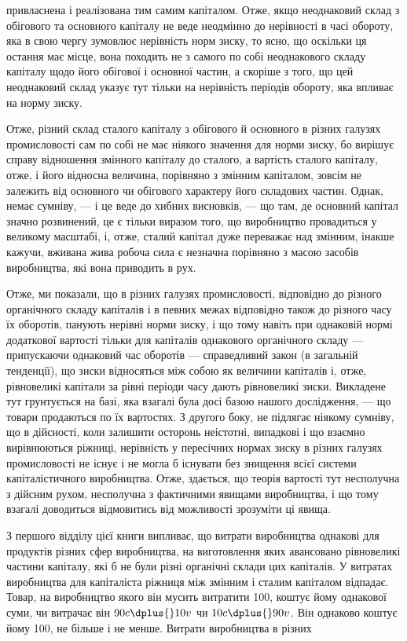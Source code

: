 \parcont{}  %
привласнена і реалізована тим самим капіталом. Отже, якщо неоднаковий склад з обігового та основного
капіталу не веде неодмінно до нерівності в часі обороту, яка в свою чергу зумовлює нерівність норм
зиску, то ясно, що оскільки ця остання
має місце, вона походить не з самого по собі неоднакового
складу капіталу щодо його обігової і основної частин, а скоріше
з того, що цей неоднаковий склад указує тут тільки на нерівність періодів обороту, яка впливає на
норму зиску.

Отже, різний склад сталого капіталу з обігового й основного
в різних галузях промисловості сам по собі не має ніякого значення для норми зиску, бо вирішує
справу відношення змінного капіталу до сталого, а вартість сталого капіталу, отже, і його
відносна величина, порівняно з змінним капіталом, зовсім не залежить від основного чи обігового
характеру його складових
частин. Однак, немає сумніву, — і це веде до хибних висновків, — що там, де основний капітал значно
розвинений, це є
тільки виразом того, що виробництво провадиться у великому
масштабі, і, отже, сталий капітал дуже переважає над змінним,
інакше кажучи, вживана жива робоча сила є незначна порівняно з масою засобів виробництва, які вона
приводить в рух.

Отже, ми показали, що в різних галузях промисловості, відповідно до різного органічного складу
капіталів і в певних
межах відповідно також до різного часу їх оборотів, панують
нерівні норми зиску, і що тому навіть при однаковій нормі додаткової вартості тільки для капіталів
однакового органічного
складу — припускаючи однаковий час оборотів — справедливий
закон (в загальній тенденції), що зиски відносяться між собою
як величини капіталів і, отже, рівновеликі капітали за рівні
періоди часу дають рівновеликі зиски. Викладене тут грунтується
на базі, яка взагалі була досі базою нашого дослідження, — що товари продаються по їх вартостях. З
другого боку, не підлягає ніякому сумніву, що в дійсності, коли залишити осторонь
неістотні, випадкові і що взаємно вирівнюються ріжниці, нерівність у пересічних нормах зиску в
різних галузях промисловості не існує і не могла б існувати без знищення всієї системи
капіталістичного виробництва. Отже, здається, що теорія вартості тут несполучна з дійсним рухом,
несполучна
з фактичними явищами виробництва, і що тому взагалі доводиться відмовитись від можливості зрозуміти
ці явища.

З першого відділу цієї книги випливає, що витрати виробництва однакові для продуктів різних сфер
виробництва, на виготовлення яких авансовано рівновеликі частини капіталу, які б
не були різні органічні склади цих капіталів. У витратах виробництва для капіталіста ріжниця між
змінним і сталим капіталом
відпадає. Товар, на виробництво якого він мусить витратити
100, коштує йому однакової суми, чи витрачає
він $90 c \dplus{} 10 v$ чи $10 c \dplus{} 90 v$. Він однаково коштує йому 100, не більше і не менше. Витрати виробництва в різних
\parbreak{}  %
